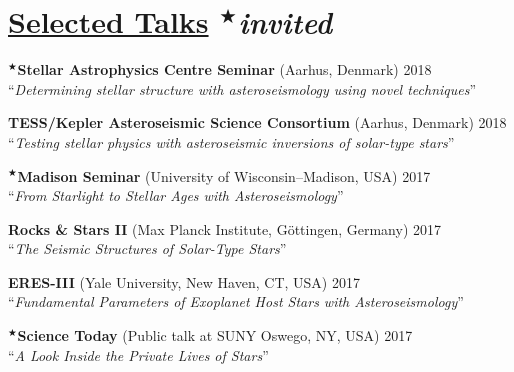   \vspace*{-4.2mm}
  \section*{{\sc\underline{Selected Talks}} \hfill {\normalsize\normalfont $^{\scriptscriptstyle\bigstar}$\emph{invited}}}
  \vspace*{-2mm}
  \noindent $^{\scriptscriptstyle\bigstar}$\textbf{Stellar Astrophysics Centre Seminar} (Aarhus, Denmark) \hfill{2018} \\
  \hphantom{$^{\scriptscriptstyle\bigstar}$}``\emph{Determining stellar structure with asteroseismology using novel techniques}''
  
  \vspace{1mm}
  \noindent \hphantom{$^{\scriptscriptstyle\bigstar}$}\textbf{TESS/Kepler Asteroseismic Science Consortium} (Aarhus, Denmark) \hfill{2018} \\
  \hphantom{$^{\scriptscriptstyle\bigstar}$}``\emph{Testing stellar physics with asteroseismic inversions of solar-type stars}''

  \vspace{1mm}
  \noindent $^{\scriptscriptstyle\bigstar}$\textbf{Madison Seminar} (University of Wisconsin--Madison, USA) \hfill{2017} \\
  \hphantom{$^{\scriptscriptstyle\bigstar}$}``\emph{From Starlight to Stellar Ages with Asteroseismology}''
  
  \vspace{1mm}
  \noindent \hphantom{$^{\scriptscriptstyle\bigstar}$}\textbf{Rocks \& Stars II} (Max Planck Institute, G\"ottingen, Germany) \hfill{2017} \\
  \hphantom{$^{\scriptscriptstyle\bigstar}$}``\emph{The Seismic Structures of Solar-Type Stars}''
  
  \vspace{1mm}
  \noindent \hphantom{$^{\scriptscriptstyle\bigstar}$}\textbf{ERES-III} (Yale University, New Haven, CT, USA) \hfill{2017} \\
  \hphantom{$^{\scriptscriptstyle\bigstar}$}``\emph{Fundamental Parameters of Exoplanet Host Stars with Asteroseismology}''
  
  \vspace{1mm}
  \noindent $^{\scriptscriptstyle\bigstar}$\textbf{Science Today} (Public talk at SUNY Oswego, NY, USA) \hfill{2017} \\
  \hphantom{$^{\scriptscriptstyle\bigstar}$}``\emph{A Look Inside the Private Lives of Stars}''
  
